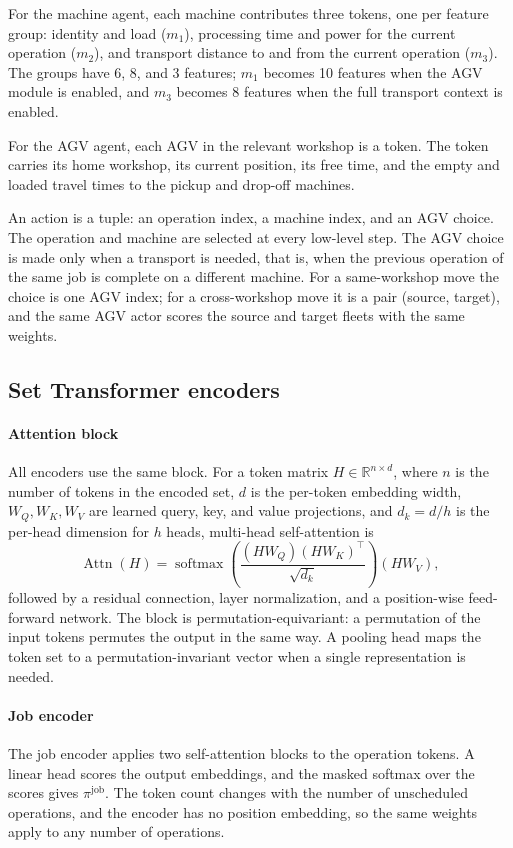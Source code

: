 For the machine agent, each machine contributes three tokens, one per feature
group: identity and load ($m_1$), processing time and power for the current
operation ($m_2$), and transport distance to and from the current operation
($m_3$). The groups have 6, 8, and 3 features; $m_1$ becomes 10 features when
the AGV module is enabled, and $m_3$ becomes 8 features when the full
transport context is enabled.

For the AGV agent, each AGV in the relevant workshop is a token. The token
carries its home workshop, its current position, its free time, and the empty
and loaded travel times to the pickup and drop-off machines.

An action is a tuple: an operation index, a machine index, and an AGV choice.
The operation and machine are selected at every low-level step. The AGV choice
is made only when a transport is needed, that is, when the previous operation of
the same job is complete on a different machine. For a same-workshop move the
choice is one AGV index; for a cross-workshop move it is a pair (source, target),
and the same AGV actor scores the source and target fleets with the same weights.

\subsection{Set Transformer encoders}

\paragraph{Attention block}
All encoders use the same block. For a token matrix $H\in\mathbb{R}^{n\times d}$, where $n$ is the number of
tokens in the encoded set, $d$ is the per-token embedding width,
$W_{Q},W_{K},W_{V}$ are learned query, key, and value projections, and
$d_k=d/h$ is the per-head dimension for $h$ heads, multi-head self-attention is
\begin{equation}
\operatorname{Attn}(H)=\operatorname{softmax}\!\left(
\frac{(HW_Q)(HW_K)^{\top}}{\sqrt{d_k}}\right)(HW_V),
\end{equation}
followed by a residual connection, layer normalization, and a position-wise
feed-forward network. The block is permutation-equivariant: a permutation of
the input tokens permutes the output in the same way. A pooling head maps the
token set to a permutation-invariant vector when a single representation is
needed.

\paragraph{Job encoder}
The job encoder applies two self-attention blocks to the operation tokens.
A linear head scores the output embeddings, and the masked softmax
over the scores gives $\pi^{\mathrm{job}}$. The token count changes with
the number of unscheduled operations, and the encoder has no position
embedding, so the same weights apply to any number of operations.

